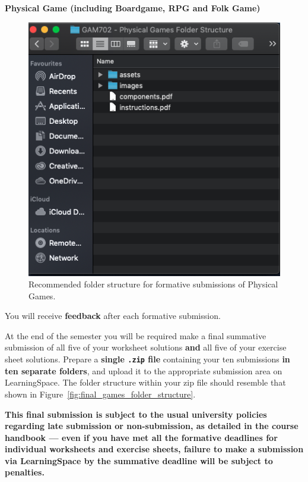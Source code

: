 \documentclass{../../fal_assignment}
\begin{document}
\pagebreak
\textbf{Physical Game (including Boardgame, RPG and Folk Game)}



\begin{figure}[H]
	\begin{center}
		\includegraphics[height=0.4\textheight]{physical_games_folder_structure}
	\end{center}
	\caption{Recommended folder structure for formative submissions of Physical Games.}
	\label{fig:phyical_game_folder_structure}
\end{figure}

You will receive \textbf{feedback} after each formative submission.


At the end of the semester you will be required make a final summative submission of all five of your worksheet solutions \textbf{and} all five of your exercise sheet solutions.
Prepare a \textbf{single \texttt{.zip} file} containing your ten submissions \textbf{in ten separate folders}, and upload it to the appropriate submission area on LearningSpace. The folder structure within your zip file should resemble that shown in Figure~\ref{fig:final_games_folder_structure}.


\textbf{This final submission is subject to the usual university policies regarding late submission or non-submission,
as detailed in the course handbook ---
even if you have met all the formative deadlines for individual worksheets and exercise sheets,
failure to make a submission via LearningSpace by the summative deadline will be subject to penalties.}
\end{document}
